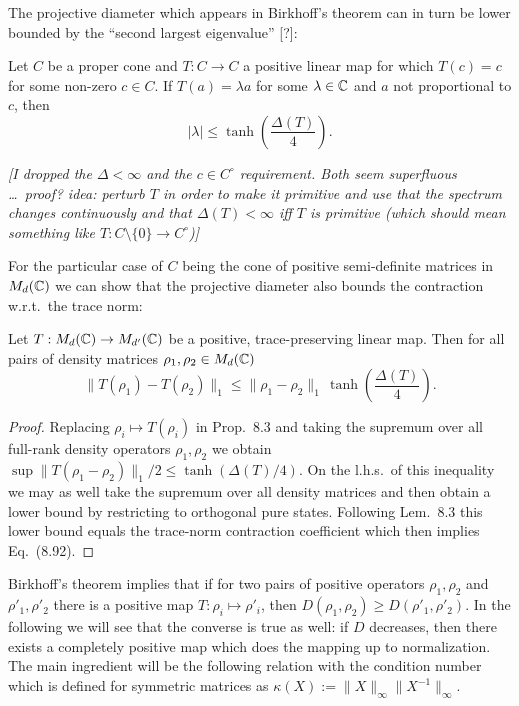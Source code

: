 \documentclass[11pt,a4paper]{article}
\theoremstyle{plain}
\theoremstyle{definition}
\theoremstyle{remark}
\begin{document}
The projective diameter which appears in Birkhoff's theorem can in turn be lower bounded by the ``second largest eigenvalue'' [?]:

\begin{theorem}
    Let $C$ be a proper cone and $T:C\to C$ a positive linear map for which $T(c)=c$ for some non-zero $c\in C$.
    If $T(a)=\lambda a$ for some $\lambda\in\mathbb{C}$ and $a$ not proportional to $c$, then
    \begin{equation}\tag{8.91}
        |\lambda| \le \tanh\!\left(\frac{\Delta(T)}{4}\right).
    \end{equation}
\end{theorem}

\emph{[I dropped the $\Delta<\infty$ and the $c\in C^\circ$ requirement. Both seem superfluous \ldots\ proof? idea: perturb $T$ in order to make it primitive and
            use that the spectrum changes continuously and that $\Delta(T)<\infty$ iff $T$ is primitive (which should mean something like $T:C\setminus\{0\}\to C^\circ$)]}

For the particular case of $C$ being the cone of positive semi-definite matrices in $M_d(\mathbb{C})$ we can show that the projective diameter also bounds the contraction w.r.t.\ the trace norm:

\begin{theorem}
    Let $T:M_d(\mathbb{C})\to M_{d'}(\mathbb{C})$ be a positive, trace-preserving linear map. Then for all pairs of density matrices $\rho_1,\rho_2\in M_d(\mathbb{C})$
    \begin{equation}\tag{8.92}
        \|T(\rho_1)-T(\rho_2)\|_1 \le \|\rho_1-\rho_2\|_1\,\tanh\!\left(\frac{\Delta(T)}{4}\right).
    \end{equation}
\end{theorem}

\begin{proof}
    Replacing $\rho_i\mapsto T(\rho_i)$ in Prop.~8.3 and taking the supremum over all full-rank density operators $\rho_1,\rho_2$ we obtain
    $\sup \|T(\rho_1-\rho_2)\|_1/2 \le \tanh(\Delta(T)/4)$. On the l.h.s.\ of this inequality we may as well take the supremum over all density matrices and then obtain a lower bound by restricting to orthogonal pure states.
    Following Lem.~8.3 this lower bound equals the trace-norm contraction coefficient which then implies Eq.~(8.92).
\end{proof}

Birkhoff's theorem implies that if for two pairs of positive operators $\rho_1,\rho_2$ and $\rho'_1,\rho'_2$ there is a positive map $T:\rho_i\mapsto\rho'_i$, then $D(\rho_1,\rho_2)\ge D(\rho'_1,\rho'_2)$.
In the following we will see that the converse is true as well: if $D$ decreases, then there exists a completely positive map which does the mapping up to normalization.
The main ingredient will be the following relation with the condition number which is defined for symmetric matrices as $\kappa(X):=\|X\|_\infty\|X^{-1}\|_\infty$.
\end{document}

